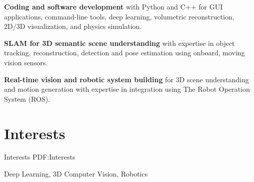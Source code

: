 \documentclass[letterpaper,MMMyyyy,nonstop]{simpleresumecv}
\newcommand{\CVNote}{CV compiled on {\today}}
\begin{document}
\begin{body}
\BulletItem
\textbf{Coding and software development} with Python and C++ for GUI applications, command-line tools, deep learning, volumetric reconstruction, 2D/3D visualization, and physics simulation.

\GapNoBreak

\BulletItem
\textbf{SLAM for 3D semantic scene understanding} with expertise in object tracking, reconstruction, detection and pose estimation using onboard, moving vision sensors.

\GapNoBreak

\BulletItem
\textbf{Real-time vision and robotic system building} for 3D scene understanding and motion generation with expertise in integration using The Robot Operation System (ROS).

%
%

\BigGapNoBreak

\section
{Interests}
{Interests}
{PDF:Interests}

Deep Learning,
3D Computer Vision,
Robotics

\end{body}


\end{document}
